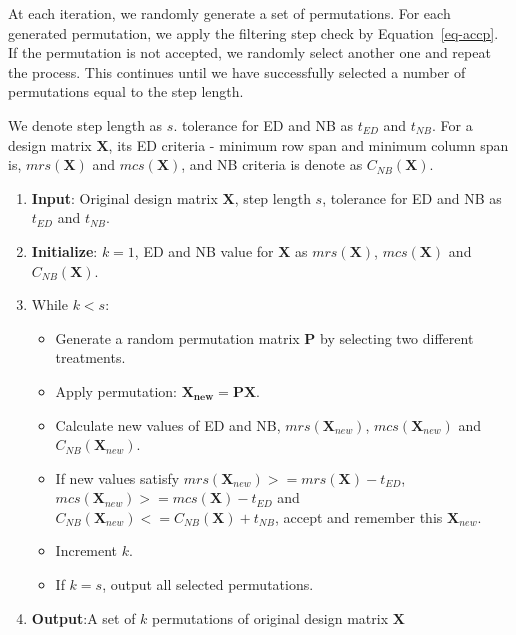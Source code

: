 \documentclass[
  a4paper,
  oneside,
  openany,
  12pt,
  onecolumn]{book}
\providecommand{\tightlist}{%
  \setlength{\itemsep}{0pt}\setlength{\parskip}{0pt}}\usepackage{longtable,booktabs,array}
\theoremstyle{definition}
\theoremstyle{definition}
\theoremstyle{plain}
\theoremstyle{remark}
\begin{document}
At each iteration, we randomly generate a set of permutations. For each
generated permutation, we apply the filtering step check by
Equation~\ref{eq-accp}. If the permutation is not accepted, we randomly
select another one and repeat the process. This continues until we have
successfully selected a number of permutations equal to the step length.

We denote step length as \(s\). tolerance for ED and NB as \(t_{ED}\)
and \(t_{NB}\). For a design matrix \(\boldsymbol{X}\), its ED criteria
- minimum row span and minimum column span is, \(mrs({\boldsymbol{X}})\)
and \(mcs({\boldsymbol{X}})\), and NB criteria is denote as
\(C_{NB}({\boldsymbol{X}})\).

\begin{enumerate}
\def\labelenumi{\arabic{enumi}.}
\tightlist
\item
  \textbf{Input}: Original design matrix \(\boldsymbol{X}\), step length
  \(s\), tolerance for ED and NB as \(t_{ED}\) and \(t_{NB}\).
\item
  \textbf{Initialize}: \(k = 1\), ED and NB value for \(\boldsymbol{X}\)
  as \(mrs({\boldsymbol{X}})\), \(mcs({\boldsymbol{X}})\) and
  \(C_{NB}({\boldsymbol{X}})\).
\item
  While \(k < s\):

  \begin{itemize}
  \tightlist
  \item
    Generate a random permutation matrix \(\boldsymbol{P}\) by selecting
    two different treatments.
  \item
    Apply permutation: \(\boldsymbol{X_{new} = \boldsymbol{P}X}\).
  \item
    Calculate new values of ED and NB, \(mrs({\boldsymbol{X}_{new}})\),
    \(mcs({\boldsymbol{X}_{new}})\) and
    \(C_{NB}({\boldsymbol{X}_{new}})\).
  \item
    If new values satisfy
    \(mrs({\boldsymbol{X}_{new}}) >= mrs({\boldsymbol{X}}) - t_{ED}\),
    \(mcs({\boldsymbol{X}_{new}}) >= mcs({\boldsymbol{X}}) - t_{ED}\)
    and
    \(C_{NB}({\boldsymbol{X}_{new}}) <= C_{NB}({\boldsymbol{X}}) + t_{NB}\),
    accept and remember this \(\boldsymbol{X}_{new}\).
  \item
    Increment \(k\).
  \item
    If \(k = s\), output all selected permutations.
  \end{itemize}
\item
  \textbf{Output}:A set of \(k\) permutations of original design matrix
  \(\boldsymbol{X}\)
\end{enumerate}
\end{document}
